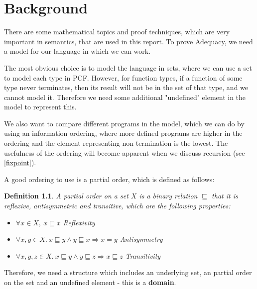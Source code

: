 \documentclass{bhamthesis}
\newtheorem{defn}{Definition}
\begin{document}
\chapter{Background}\label{ch2}
There are some mathematical topics and proof techniques, which are very important in semantics, that are used in this report. To prove Adequacy, we need a model for our language in which we can work.

The most obvious choice is to model the language in sets, where we can use a set to model each type in PCF. However, for function types, if a function of some type never terminates, then its result will not be in the set of that type, and we cannot model it. Therefore we need some additional "undefined" element in the model to represent this.

We also want to compare different programs in the model, which we can do by using an information ordering, where more defined programs are higher in the ordering and the element representing non-termination is the lowest. The usefulness of the ordering will become apparent when we discuss recursion (see \ref{fixpoint}).

A good ordering to use is a partial order, which is defined as follows:

\vspace{0.25cm}

\begin{defn}
A partial order on a set $X$ is a binary relation $\sqsubseteq$  that it is reflexive, antisymmetric and transitive, which are the following properties:
\begin{itemize}
      \item{$\forall x \in X, \ x \sqsubseteq x$ \hspace{4.5cm} Reflexivity}
      \item{$\forall x, y \in X. \  x \sqsubseteq y \wedge y \sqsubseteq x \Rightarrow x = y$ \hspace{1cm} Antisymmetry}
      \item{$\forall x, y, z \in X. \ x \sqsubseteq y \wedge y \sqsubseteq z \Rightarrow x \sqsubseteq z$ \hspace{1cm} Transitivity}
\end{itemize} 
\end{defn}


Therefore, we need a structure which includes an underlying set, an partial order on the set and an undefined element - this is a \textbf{domain}.
 
\end{document}

